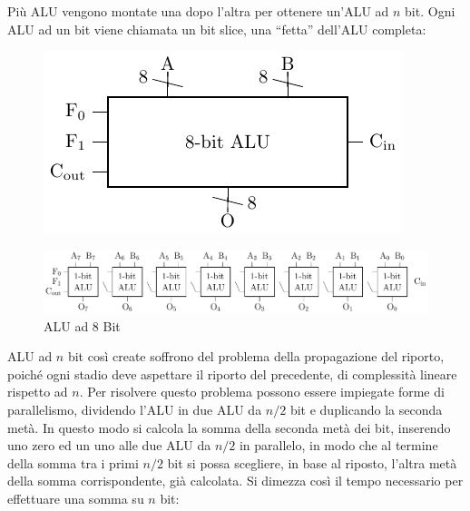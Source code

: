 \documentclass{article}
\numberwithin{equation}{subsection}
\begin{document}
Più ALU vengono montate una dopo l'altra per ottenere un'ALU ad $n$ bit. Ogni ALU ad un bit viene chiamata un bit slice, una ``fetta'' dell'ALU completa:
\begin{figure}[H]%
    \centering%
    \includegraphics{alu-8-bit-compatta.pdf}%
\end{figure}
\begin{figure}[H]%
    \centering
    \includegraphics[scale=0.69]{alu-8-bit.pdf}%
    \caption{ALU ad 8 Bit}%
\end{figure}

ALU ad $n$ bit così create 
soffrono del problema della propagazione del riporto, poiché ogni stadio deve aspettare il riporto del precedente, di complessità lineare rispetto ad $n$. Per risolvere questo problema 
possono essere impiegate forme di parallelismo, dividendo l'ALU in due ALU da $n/2$ bit e duplicando la seconda metà. In questo modo si calcola la somma della seconda metà dei bit, 
inserendo uno zero ed un uno alle due ALU da $n/2$ in parallelo, in modo che al termine della somma tra i primi $n/2$ bit si possa scegliere, in base al riposto, l'altra metà della 
somma corrispondente, già calcolata. Si dimezza così il tempo necessario per effettuare una somma su $n$ bit:
\end{document}
